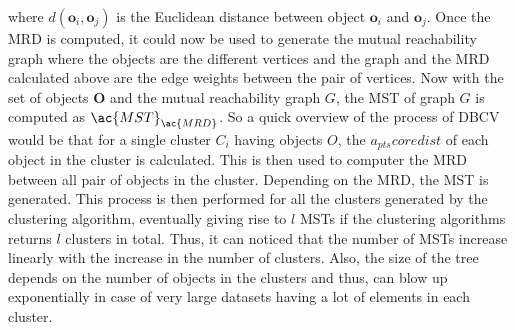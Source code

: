 where $ d(\textbf{o}_i, \textbf{o}_j)$ is the Euclidean distance between object $\textbf{o}_i$ and $\textbf{o}_j$. Once the \ac{MRD} is computed, it could now be used to generate the mutual reachability graph where the objects are the different vertices and the graph and the \ac{MRD} calculated above are the edge weights between the pair of vertices. Now with the set of objects $\textbf{O}$ and the mutual reachability graph $G$, the \ac{MST} of graph $G$ is computed as $\ac{MST}_{\ac{MRD}}$. So a quick overview of the process of \ac{DBCV} would be that for a single cluster $C_i$ having objects $O$, the $a_{pts}coredist$ of each object in the cluster is calculated. This is then used to computer the \ac{MRD} between all pair of objects in the cluster. Depending on the \ac{MRD}, the \ac{MST} is generated. This process is then performed for all the clusters generated by the clustering algorithm, eventually giving rise to $l$ \ac{MST}s if the clustering algorithms returns $l$ clusters in total. Thus, it can noticed that the number of \ac{MST}s increase linearly with the increase in the number of clusters. Also, the size of the tree depends on the number of objects in the clusters and thus, can blow up exponentially in case of very large datasets having a lot of elements in each cluster.  

\vspace{5 mm}

